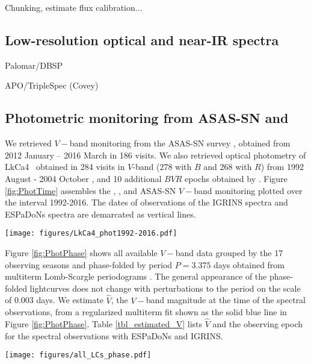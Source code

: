 \documentclass[twocolumn]{emulateapj}%
\newcommand{\name}{LkCa4 }
\begin{document}
Chunking, estimate flux calibration...


\subsection{Low-resolution optical and near-IR spectra}

Palomar/DBSP \citep{herczeg14}

APO/TripleSpec (Covey)



\subsection{Photometric monitoring from ASAS-SN and \citet{grankin08}}

We retrieved $V-$band monitoring from the ASAS-SN survey \citep{shappee14}, obtained from 2012 January -- 2016 March in 186 visits.
We also retrieved optical photometry of \name\ obtained in 284 visits in $V$-band (278 with $B$ and 268 with $R$) from 1992 August - 2004 October \citep{grankin08}, and 10 additional $BVR$ epochs obtained by \citet{donati14}.   Figure \ref{fig:PhotTime} assembles the \citet{grankin08}, \citet{donati14}, and ASAS-SN $V-$band monitoring plotted over the interval 1992-2016.  The dates of observations of the IGRINS spectra and ESPaDoNs spectra are demarcated as vertical lines.


\begin{figure*}
	\centering
	\texttt{[image: figures/LkCa4\_phot1992-2016.pdf]}
	\caption{\name $V-$band photometric monitoring from 1992-2016.}
	\label{fig:PhotTime}
\end{figure*}

Figure \ref{fig:PhotPhase} shows all available $V-$band data grouped by the 17 observing seasons and phase-folded by period $P=3.375$ days obtained from multiterm Lomb-Scargle periodograms \citep{ivezic14}.  The general appearance of the phase-folded lightcurves does not change with perturbations to the period on the scale of 0.003 days.  We estimate $\hat V$, the $V-$band magnitude at the time of the spectral observations, from a regularized multiterm fit \citep{vanderplas15a} shown as the solid blue line in Figure \ref{fig:PhotPhase}.  Table \ref{tbl_estimated_V} lists $\hat V$ and the observing epoch for the spectral observations with ESPaDoNs and IGRINS.

\begin{figure*}
	\centering
	\texttt{[image: figures/all\_LCs\_phase.pdf]}
	\caption{Phase-folded lightcurves constructed assuming the same period for all observing seasons.  The blue solid lines show a multi-term periodic fit keeping the first $M_{\rm max}=4$ Fourier components.  The vertical lines show the epochs of observations for available spectroscopy.  The unchanged vertical scale highlights the secular drift of the light curve amplitude and morphology.}
	\label{fig:PhotPhase}
\end{figure*}
\end{document}
